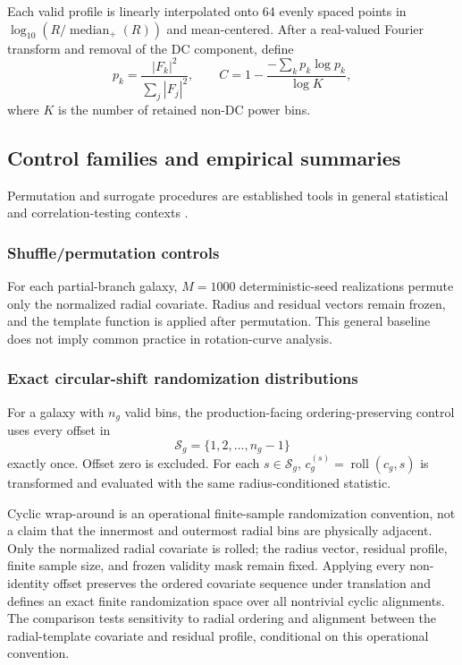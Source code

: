 Each valid profile is linearly interpolated onto 64 evenly spaced points in
$\log_{10}(R/\operatorname{median}_{+}(R))$ and mean-centered. After a
real-valued Fourier transform and removal of the DC component, define
\begin{equation}
p_k=\frac{|F_k|^2}{\sum_j |F_j|^2},
\qquad
C=1-\frac{-\sum_k p_k\log p_k}{\log K},
\end{equation}
where $K$ is the number of retained non-DC power bins.

\subsection{Control families and empirical summaries}
\label{sec:controls}

Permutation and surrogate procedures are established tools in general
statistical and correlation-testing contexts
\citep{SchreiberSchmitz2000,PhipsonSmyth2010,YuHutson2022}.

\subsubsection{Shuffle/permutation controls}

For each partial-branch galaxy, $M=1000$ deterministic-seed realizations
permute only the normalized radial covariate. Radius and residual vectors
remain frozen, and the template function is applied after permutation. This
general baseline does not imply common practice in rotation-curve analysis.

\subsubsection{Exact circular-shift randomization distributions}

For a galaxy with $n_g$ valid bins, the production-facing
ordering-preserving control uses every offset in
\begin{equation}
\mathcal{S}_g=\{1,2,\ldots,n_g-1\}
\end{equation}
exactly once. Offset zero is excluded. For each $s\in\mathcal{S}_g$,
$c_g^{(s)}=\operatorname{roll}(c_g,s)$ is transformed and evaluated with the
same radius-conditioned statistic.

Cyclic wrap-around is an operational finite-sample randomization convention,
not a claim that the innermost and outermost radial bins are physically
adjacent. Only the normalized radial covariate is rolled; the radius vector,
residual profile, finite sample size, and frozen validity mask remain fixed.
Applying every non-identity offset preserves the ordered covariate sequence
under translation and defines an exact finite randomization space over all
nontrivial cyclic alignments. The comparison tests sensitivity to radial
ordering and alignment between the radial-template covariate and residual
profile, conditional on this operational convention.

